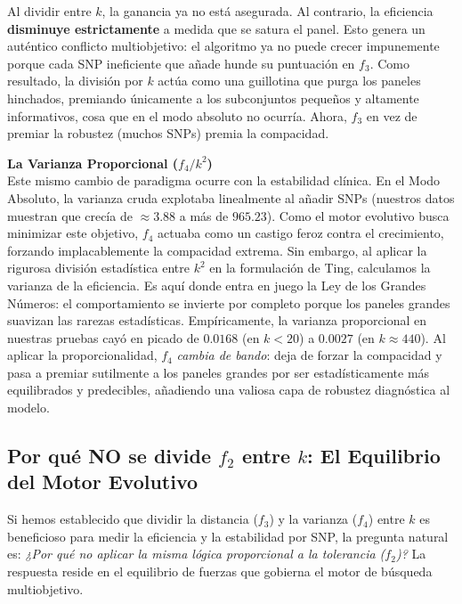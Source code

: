 \documentclass[11pt,a4paper]{article}
\begin{document}
Al dividir entre $k$, la ganancia ya no está asegurada. Al contrario, la eficiencia \textbf{disminuye estrictamente} a medida que se satura el panel. Esto genera un auténtico conflicto multiobjetivo: el algoritmo ya no puede crecer impunemente porque cada SNP ineficiente que añade hunde su puntuación en $f_3$. Como resultado, la división por $k$ actúa como una guillotina que purga los paneles hinchados, premiando únicamente a los subconjuntos pequeños y altamente informativos, cosa que en el modo absoluto no ocurría. Ahora, $f_3$ en vez de premiar la robustez (muchos SNPs) premia la compacidad.

\textbf{La Varianza Proporcional ($f_4 / k^2$)}\\
Este mismo cambio de paradigma ocurre con la estabilidad clínica. En el Modo Absoluto, la varianza cruda explotaba linealmente al añadir SNPs (nuestros datos muestran que crecía de $\approx 3.88$ a más de $965.23$). Como el motor evolutivo busca minimizar este objetivo, $f_4$ actuaba como un castigo feroz contra el crecimiento, forzando implacablemente la compacidad extrema. 
Sin embargo, al aplicar la rigurosa división estadística entre $k^2$ en la formulación de Ting, calculamos la varianza de la eficiencia. Es aquí donde entra en juego la Ley de los Grandes Números: el comportamiento se invierte por completo porque los paneles grandes suavizan las rarezas estadísticas. Empíricamente, la varianza proporcional en nuestras pruebas cayó en picado de $0.0168$ (en $k<20$) a $0.0027$ (en $k \approx 440$). Al aplicar la proporcionalidad, $f_4$ \textit{cambia de bando}: deja de forzar la compacidad y pasa a premiar sutilmente a los paneles grandes por ser estadísticamente más equilibrados y predecibles, añadiendo una valiosa capa de robustez diagnóstica al modelo.

\subsection{Por qué NO se divide $f_2$ entre $k$: El Equilibrio del Motor Evolutivo}

Si hemos establecido que dividir la distancia ($f_3$) y la varianza ($f_4$) entre $k$ es beneficioso para medir la eficiencia y la estabilidad por SNP, la pregunta natural es: \textit{¿Por qué no aplicar la misma lógica proporcional a la tolerancia ($f_2$)?} La respuesta reside en el equilibrio de fuerzas que gobierna el motor de búsqueda multiobjetivo.
\end{document}
